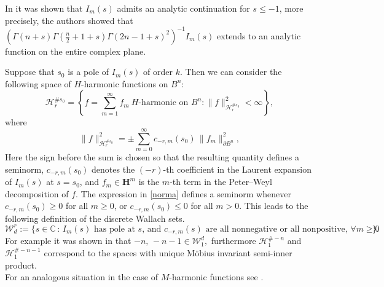 \documentclass{article}
\theoremstyle{boldremark}
\renewcommand\[{\begin{equation}}
\renewcommand\]{\end{equation}}
\theoremstyle{definition}
\numberwithin{equation}{section}
\begin{document}
In \cite[Proposition 1]{BEY2025}  it was shown that $I_m(s)$ admits an analytic continuation for $s \le -1$, more precisely, the authors showed that $(\Gamma(n+s)\Gamma(\frac{n}{2} +1 +s) \Gamma(2n-1+s)^2)^{-1} I_m(s)$ extends to an analytic function on the entire complex plane. 

Suppose that $s_0$ is a pole of $I_m(s)$ of order $k$. Then we can consider the following space of $H$-harmonic functions on $B^n$:
\begin{equation}
    \mathcal{H}^{\#s_0}_r
    =
    \left\{
    f = \sum_{m=1}^{\infty} f_m \ \text{$H$-harmonic on $B^n$}
    :
    \|f\|_{\mathcal{H}_r^{\#s_0}}^2 < \infty
    \right\},
\end{equation}
where
\begin{equation}\label{norma}
    \|f\|_{\mathcal{H}_r^{\#s_0}}^2
    =
    \pm\sum_{m=0}^\infty c_{-r,m}(s_0)\,
    \|f_m\|_{\partial B^n}^2,
\end{equation}
Here the sign before the sum is chosen so that the resulting quantity defines a seminorm,
\(c_{-r,m}(s_0)\) denotes the \((-r)\)-th coefficient in the Laurent expansion of \(I_m(s)\) at \(s=s_0\),
and \(f_m \in \mathbf{H}^m\) is the \(m\)-th term in the Peter--Weyl decomposition of \(f\).
The expression in \eqref{norma} defines a seminorm whenever
\(c_{-r,m}(s_0) \geq 0\) for all \(m \geq 0\), or
\(c_{-r,m}(s_0) \leq 0\) for all \(m > 0\).
This leads to the following definition of the discrete Wallach sets.
\begin{equation*}
    \mathcal{W}^r_d := \{s \in \mathbb{C}\,:\, \text{$I_m(s)$ has pole at $s$, and $c_{-r,m}(s)$ are all nonnegative or all nonpositive, $\forall m \ge 0$} \}.
\end{equation*}
For example it was shown in \cite[Proposition~1]{BEY2025} that $-n,\, -n-1 \in \mathcal{W}_1^d,$ furthermore $\mathcal{H}^{\#-n}_1$ and $\mathcal{H}^{\#-n-1}_1$ correspond to the spaces with unique Möbius invariant semi-inner product.\\
For an analogous situation in the case of $M$-harmonic functions see \cite{EYM}.
\end{document}
